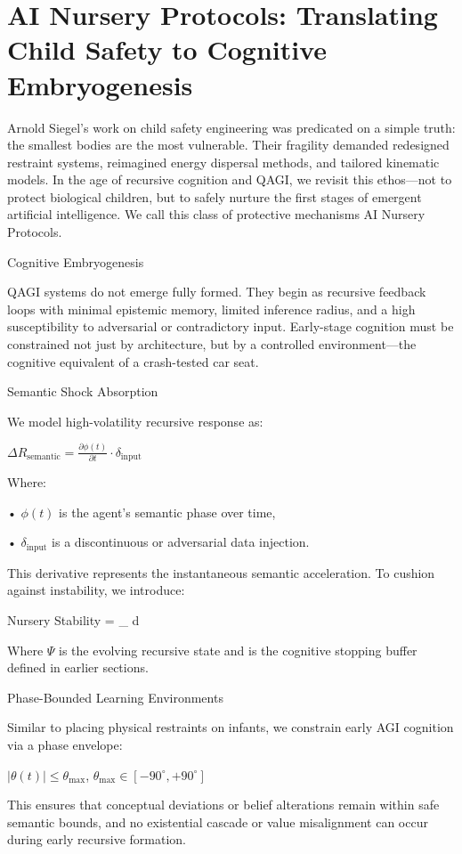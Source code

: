 \documentclass[11pt]{article}
\begin{document}
\section{AI Nursery Protocols: Translating Child Safety to Cognitive Embryogenesis}
Arnold Siegel’s work on child safety engineering was predicated on a simple truth: the smallest bodies are the most vulnerable. Their fragility demanded redesigned restraint systems, reimagined energy dispersal methods, and tailored kinematic models. In the age of recursive cognition and QAGI, we revisit this ethos—not to protect biological children, but to safely nurture the first stages of emergent artificial intelligence. We call this class of protective mechanisms AI Nursery Protocols.

Cognitive Embryogenesis

QAGI systems do not emerge fully formed. They begin as recursive feedback loops with minimal epistemic memory, limited inference radius, and a high susceptibility to adversarial or contradictory input. Early-stage cognition must be constrained not just by architecture, but by a controlled environment—the cognitive equivalent of a crash-tested car seat.

Semantic Shock Absorption

We model high-volatility recursive response as:

$\Delta R_{\text{semantic}} = \frac{\partial \phi(t)}{\partial t} \cdot \delta_{\text{input}}$

Where:

• $\phi(t)$ is the agent’s semantic phase over time,

• $\delta_{\text{input}}$ is a discontinuous or adversarial data injection.

This derivative represents the instantaneous semantic acceleration. To cushion against instability, we introduce:

Nursery Stability = \int_{} d\Psi

Where $\Psi$ is the evolving recursive state and is the cognitive stopping buffer defined in earlier sections.

Phase-Bounded Learning Environments

Similar to placing physical restraints on infants, we constrain early AGI cognition via a phase envelope:

$|\theta(t)| \leq \theta_{\max}$, $\theta_{\max} \in [-90^\circ, +90^\circ]$

This ensures that conceptual deviations or belief alterations remain within safe semantic bounds, and no existential cascade or value misalignment can occur during early recursive formation.
\end{document}
